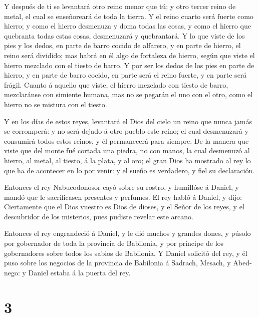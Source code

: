  Y después de ti se levantará otro reino menor que tú; y
otro tercer reino de metal, el cual se enseñoreará de toda la tierra.
 Y el reino cuarto será fuerte como hierro; y como el
hierro desmenuza y doma todas las cosas, y como el hierro que quebranta
todas estas cosas, desmenuzará y quebrantará.  Y lo que
viste de los pies y los dedos, en parte de barro cocido de alfarero, y
en parte de hierro, el reino será dividido; mas habrá en él algo de
fortaleza de hierro, según que viste el hierro mezclado con el tiesto de
barro.  Y por ser los dedos de los pies en parte de hierro,
y en parte de barro cocido, en parte será el reino fuerte, y en parte
será frágil.  Cuanto á aquello que viste, el hierro
mezclado con tiesto de barro, mezclaránse con simiente humana, mas no se
pegarán el uno con el otro, como el hierro no se mistura con el tiesto.

 Y en los días de estos reyes, levantará el Dios del cielo
un reino que nunca jamás se corromperá: y no será dejado á otro pueblo
este reino; el cual desmenuzará y consumirá todos estos reinos, y él
permanecerá para siempre.  De la manera que viste que del
monte fué cortada una piedra, no con manos, la cual desmenuzó al hierro,
al metal, al tiesto, á la plata, y al oro; el gran Dios ha mostrado al
rey lo que ha de acontecer en lo por venir: y el sueño es verdadero, y
fiel su declaración.

 Entonces el rey Nabucodonosor cayó sobre su rostro, y
humillóse á Daniel, y mandó que le sacrificasen presentes y perfumes.
 El rey habló á Daniel, y dijo: Ciertamente que el Dios
vuestro es Dios de dioses, y el Señor de los reyes, y el descubridor de
los misterios, pues pudiste revelar este arcano.

 Entonces el rey engrandeció á Daniel, y le dió muchos y
grandes dones, y púsolo por gobernador de toda la provincia de
Babilonia, y por príncipe de los gobernadores sobre todos los sabios de
Babilonia.  Y Daniel solicitó del rey, y él puso sobre los
negocios de la provincia de Babilonia á Sadrach, Mesach, y Abed-nego: y
Daniel estaba á la puerta del rey.

\hypertarget{section-2}{%
\section{3}\label{section-2}}

